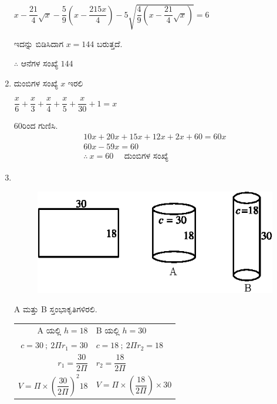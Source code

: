 \begin{enumerate}
$x - \dfrac{21}{4} \sqrt{x} - \dfrac{5}{9} \left(x - \dfrac{215x}{4}\right) - 5 \sqrt{\dfrac{4}{9} \left(x - \dfrac{21}{4} \sqrt{x}\right)} = 6$

\vskip 0.1cm

ಇದನ್ನು ಬಿಡಿಸಿದಾಗ $x = 144$ ಬರುತ್ತದೆ. 

$\therefore$ ಆನೆಗಳ ಸಂಖ್ಯೆ $144$

\item ದುಂಬಿಗಳ ಸಂಖ್ಯೆ $x$ ಇರಲಿ 

\vskip 0.2cm

$\dfrac{x}{6} + \dfrac{x}{3} + \dfrac{x}{4} + \dfrac{x}{5} + \dfrac{x}{30} + 1 = x$

\vskip 0.2cm

60ರಿಂದ ಗುಣಿಸಿ. 
\begin{gather*}
10x + 20x + 15x + 12x + 2x + 60 = 60 x\\
60x - 59x = 60\\
\therefore~ x = 60 \quad\text{ ದುಂಬಿಗಳ ಸಂಖ್ಯೆ}
\end{gather*}

\item 
~

\begin{figure}[H]
\centering
\includegraphics[scale=1.2]{images/chap9/ans26.eps}
\end{figure}

A ಮತ್ತು B ಸ್ತಂಭಾಕೃತಿಗಳಿರಲಿ. 

\begin{tabular}[t]{rl}
A ಯಲ್ಲಿ \quad $h = 18$ & B ಯಲ್ಲಿ \quad $h = 30$\\[0.1cm]
$c = 30 ~;~ 2\Pi r_{1} = 30$  & $c = 18 ~;~ 2\Pi r_{2} = 18$\\[0.1cm]
$r_{1} = \dfrac{30}{2\Pi}$ & $r_{2} = \dfrac{18}{2\Pi}$\\[0.2cm]
$V = \Pi\times \left(\dfrac{30}{2\Pi}\right)^{2} 18$ & $V = \Pi\times \left(\dfrac{18}{2\Pi}\right) \times 30$
\end{tabular}


\end{enumerate}
